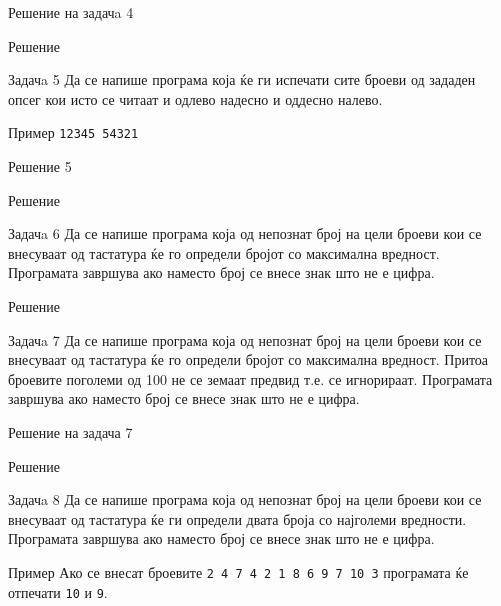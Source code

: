 \begin{frame}[fragile]{Решение на задачa 4}
\begin{exampleblock}{Решение}

\end{exampleblock}
\end{frame}

\begin{frame}[fragile]{Задачa 5}
Да се напише програма која ќе ги испечати сите броеви од зададен опсег кои исто
се читаат и одлево надесно и оддесно налево.
\begin{exampleblock}{Пример}
\texttt{12345    54321}
\end{exampleblock}
\end{frame}

\begin{frame}[fragile]{Решение 5}
\begin{exampleblock}{Решение}

\end{exampleblock}
\end{frame}


\begin{frame}[fragile]{Задачa 6}
\scriptsize{Да се напише програма која од непознат број на цели броеви кои се внесуваат 
од тастатура ќе го определи бројот со максимална вредност. 
Програмата завршува ако наместо број се внесе знак што не е цифра.}
\pause
\begin{exampleblock}{Решение}

\end{exampleblock}
\end{frame}


\begin{frame}[fragile]{Задачa 7}
Да се напише програма која од непознат број на цели броеви кои се внесуваат од 
тастатура ќе го определи бројот со максимална вредност. 
Притоа броевите поголеми од 100 не се земаат предвид т.е. се игнорираат. 
Програмата завршува ако наместо број се внесе знак што не е цифра.
\end{frame}

\begin{frame}[fragile]{Решение на задача 7}
\begin{exampleblock}{Решение}

\end{exampleblock}
\end{frame}

\begin{frame}{Задачa 8}
Да се напише програма која од непознат број на цели броеви кои се внесуваат од тастатура 
ќе ги определи двата броја со најголеми вредности. Програмата завршува ако наместо 
број се внесе знак што не е цифра. 
\begin{exampleblock}{Пример}
Ако се внесат броевите \texttt{2 4 7 4 2 1 8 6 9 7 10 3} програмата ќе отпечати 
\texttt{10} и \texttt{9}.
\end{exampleblock}
\end{frame}

